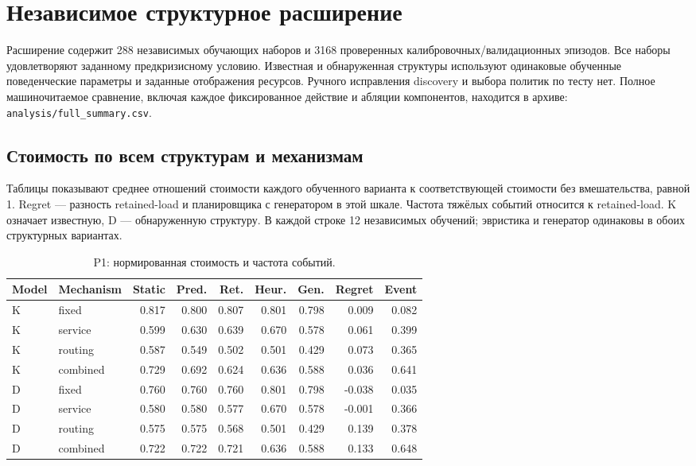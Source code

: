 \clearpage

\section{Независимое структурное расширение}

Расширение содержит 288 независимых обучающих наборов и 3168 проверенных калибровочных/валидационных эпизодов. Все наборы удовлетворяют заданному предкризисному условию. Известная и обнаруженная структуры используют одинаковые обученные поведенческие параметры и заданные отображения ресурсов. Ручного исправления discovery и выбора политик по тесту нет. Полное машиночитаемое сравнение, включая каждое фиксированное действие и абляции компонентов, находится в архиве: \texttt{analysis/full\_summary.csv}.

\subsection{Стоимость по всем структурам и механизмам}

Таблицы показывают среднее отношений стоимости каждого обученного варианта к соответствующей стоимости без вмешательства, равной 1. Regret — разность retained-load и планировщика с генератором в этой шкале. Частота тяжёлых событий относится к retained-load. K означает известную, D — обнаруженную структуру. В каждой строке 12 независимых обучений; эвристика и генератор одинаковы в обоих структурных вариантах.

\begin{table}[htbp]\caption{P1: нормированная стоимость и частота событий.}\centering\small\setlength{\tabcolsep}{3pt}

\begin{tabular}{llrrrrrrr}\toprule

Model & Mechanism & Static & Pred. & Ret. & Heur. & Gen. & Regret & Event\\\midrule

K & fixed & 0.817 & 0.800 & 0.807 & 0.801 & 0.798 & 0.009 & 0.082\\

K & service & 0.599 & 0.630 & 0.639 & 0.670 & 0.578 & 0.061 & 0.399\\

K & routing & 0.587 & 0.549 & 0.502 & 0.501 & 0.429 & 0.073 & 0.365\\

K & combined & 0.729 & 0.692 & 0.624 & 0.636 & 0.588 & 0.036 & 0.641\\

D & fixed & 0.760 & 0.760 & 0.760 & 0.801 & 0.798 & -0.038 & 0.035\\

D & service & 0.580 & 0.580 & 0.577 & 0.670 & 0.578 & -0.001 & 0.366\\

D & routing & 0.575 & 0.575 & 0.568 & 0.501 & 0.429 & 0.139 & 0.378\\

D & combined & 0.722 & 0.722 & 0.721 & 0.636 & 0.588 & 0.133 & 0.648\\

\bottomrule\end{tabular}\end{table}

